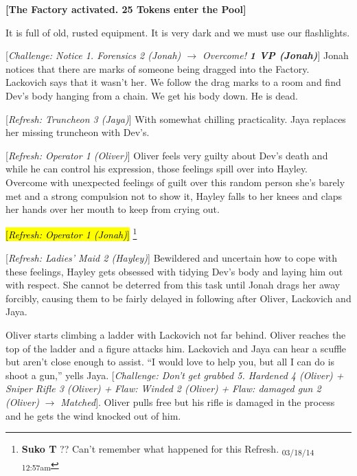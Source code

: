 \textbf{{[}The Factory activated.  25 Tokens enter the Pool{]}}



It is full of old, rusted equipment.  It is very dark and we must use our flashlights.



{[}\textit{Challenge: Notice 1.  Forensics 2 (Jonah) $\rightarrow$ Overcome! }\textit{\textbf{1 VP (Jonah)}}{]}  Jonah notices that there are marks of someone being dragged into the Factory.  Lackovich says that it wasn't her.  We follow the drag marks to a room and find Dev's body hanging from a chain.  We get his body down. He is dead.



{[}\textit{Refresh: Truncheon 3 (Jaya)}{]}  With somewhat chilling practicality.  Jaya replaces her missing truncheon with Dev's.



{[}\textit{Refresh: Operator 1 (Oliver)}{]}  Oliver feels very guilty about Dev's death and while he can control his expression, those feelings spill over into Hayley.  Overcome with unexpected feelings of guilt over this random person she's barely met and a strong compulsion not to show it, Hayley falls to her knees and claps her hands over her mouth to keep from crying out.



\hl{{[}\textit{Refresh: Operator 1 (Jonah)}{]} }\footnote{\textbf{Suko T }?? Can't remember what happened for this Refresh. \textsubscript{03/18/14 12:57am}}



{[}\textit{Refresh: Ladies' Maid 2 (Hayley)}{]} Bewildered and uncertain how to cope with these feelings, Hayley gets obsessed with tidying Dev's body and laying him out with respect.  She cannot be deterred from this task until Jonah drags her away forcibly, causing them to be fairly delayed in following after Oliver, Lackovich and Jaya.



Oliver starts climbing a ladder with Lackovich not far behind.  Oliver reaches the top of the ladder and a figure attacks him.  Lackovich and Jaya can hear a scuffle but aren't close enough to assist.  ``I would love to help you, but all I can do is shoot a gun,'' yells Jaya.  {[}\textit{Challenge: Don't get grabbed 5.  Hardened 4 (Oliver) + Sniper Rifle 3 (Oliver) + }\textit{ {\color[RGB]{255,0,0}Flaw: Winded 2 (Oliver)} }\textit{ + }\textit{ {\color[RGB]{255,0,0}Flaw: damaged gun 2 (Oliver)} }\textit{ $\rightarrow$ Matched}{]}.  Oliver pulls free but his rifle is damaged in the process and he gets the wind knocked out of him.



